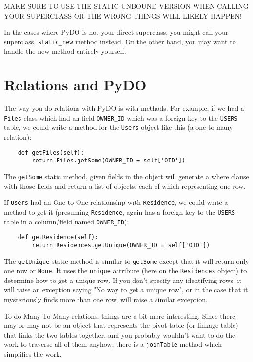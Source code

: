\documentclass[titlepage]{manual}
\begin{document}
MAKE SURE TO USE THE STATIC UNBOUND VERSION WHEN CALLING YOUR
SUPERCLASS OR THE WRONG THINGS WILL LIKELY HAPPEN!

In the cases where PyDO is not your direct superclass, you might call
your superclass' \texttt{static_new} method instead.  On the other
hand, you may want to handle the new method entirely yourself.


\section{Relations and PyDO}
The way you do relations with PyDO is with methods.  For example, if
we had a \texttt{Files} class which had an field \texttt{OWNER_ID}
which was a foreign key to the \texttt{USERS} table, we could write a
method for the \texttt{Users} object like this (a one to many
relation):
\begin{verbatim}
    def getFiles(self):
        return Files.getSome(OWNER_ID = self['OID'])
\end{verbatim}

The \texttt{getSome} static method, given fields in the object will
generate a where clause with those fields and return a list of
objects, each of which representing one row.

If \texttt{Users} had an One to One relationship with
\texttt{Residence}, we could write a method to get it (presuming
\texttt{Residence}, again has a foreign key to the \texttt{USERS}
table in a column/field named \texttt{OWNER_ID}):

\begin{verbatim}
    def getResidence(self):
        return Residences.getUnique(OWNER_ID = self['OID'])
\end{verbatim}

The \texttt{getUnique} static method is similar to \texttt{getSome}
except that it will return only one row or \texttt{None}.  It uses the
\texttt{unique} attribute (here on the \texttt{Residences} object) to
determine how to get a unique row.  If you don't specify any
identifying rows, it will raise an exception saying "No way to get a
unique row", or in the case that it mysteriously finds more than one
row, will raise a similar exception.

To do Many To Many relations, things are a bit more interesting.
Since there may or may not be an object that represents the pivot
table (or linkage table) that links the two tables together, and you
probably wouldn't want to do the work to traverse all of them anyhow,
there is a \texttt{joinTable} method which simplifies the work.
\end{document}
